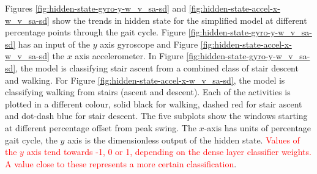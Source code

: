 \documentclass[sensors,article,submit,moreauthors,pdftex]{Definitions/mdpi}
\begin{document}
Figures \ref{fig:hidden-state-gyro-y-w_v_sa-sd} and \ref{fig:hidden-state-accel-x-w_v_sa-sd} show the trends in hidden state for the simplified model at different percentage points through the gait cycle. Figure \ref{fig:hidden-state-gyro-y-w_v_sa-sd} has an input of the $y$ axis gyroscope and Figure \ref{fig:hidden-state-accel-x-w_v_sa-sd} the $x$ axis accelerometer. In Figure \ref{fig:hidden-state-gyro-y-w_v_sa-sd}, the model is classifying stair ascent from a combined class of stair descent and walking. For Figure \ref{fig:hidden-state-accel-x-w_v_sa-sd}, the model is classifying walking from stairs (ascent and descent). Each of the activities is plotted in a different colour, solid black for walking, dashed red for stair ascent and dot-dash blue for stair descent. The five subplots show the windows starting at different percentage offset from peak swing. The $x$-axis has units of percentage gait cycle, the $y$ axis is the dimensionless output of the hidden state. \textcolor{red}{Values of the $y$ axis tend towards -1, 0 or 1, depending on the dense layer classifier weights. A value close to these represents a more certain classification}.
\end{document}
